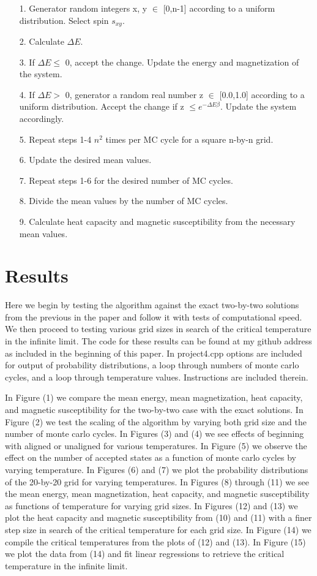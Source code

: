 \documentclass[11pt,a4paper]{article}
\begin{document}
\begin{enumerate}
\item[1.]
Generator random integers x, y $\in$ [0,n-1] according to a uniform distribution. Select spin $s_{xy}$.
\item[2.]
Calculate $\Delta E$.
\item[3.]
If $\Delta E \leq$ 0, accept the change. Update the energy and magnetization of the system.
\item[4.]
If $\Delta E >$ 0, generator a random real number z $\in$ [0.0,1.0] according to a uniform distribution. Accept the change if z $\leq e^{-\Delta E\beta}$. Update the system accordingly.
\item[5.]
Repeat steps 1-4 $n^2$ times per MC cycle for a square n-by-n grid.
\item[6.]
Update the desired mean values.
\item[7.]
Repeat steps 1-6 for the desired number of MC cycles.
\item[8.]
Divide the mean values by the number of MC cycles.
\item[9.]
Calculate heat capacity and magnetic susceptibility from the necessary mean values.
\end{enumerate}

\section{Results}

Here we begin by testing the algorithm against the exact two-by-two solutions from the previous in the paper and follow it with tests of computational speed. We then proceed to testing various grid sizes in search of the critical temperature in the infinite limit. The code for these results can be found at my github address as included in the beginning of this paper. In project4.cpp options are included for output of probability distributions, a loop through numbers of monte carlo cycles, and a loop through temperature values. Instructions are included therein.

In Figure (1) we compare the mean energy, mean magnetization, heat capacity, and magnetic susceptibility for the two-by-two case with the exact solutions. In Figure (2) we test the scaling of the algorithm by varying both grid size and the number of monte carlo cycles. In Figures (3) and (4) we see effects of beginning with aligned or unaligned for various temperatures. In Figure (5) we observe the effect on the number of accepted states as a function of monte carlo cycles by varying temperature. In Figures (6) and (7) we plot the probability distributions of the 20-by-20 grid for varying temperatures. In Figures (8) through (11) we see the mean energy, mean magnetization, heat capacity, and magnetic susceptibility as functions of temperature for varying grid sizes. In Figures (12) and (13) we plot the heat capacity and magnetic susceptibility from (10) and (11) with a finer step size in search of the critical temperature for each grid size. In Figure (14) we compile the critical temperatures from the plots of (12) and (13). In Figure (15) we plot the data from (14) and fit linear regressions to retrieve the critical temperature in the infinite limit.
 
\end{document}

